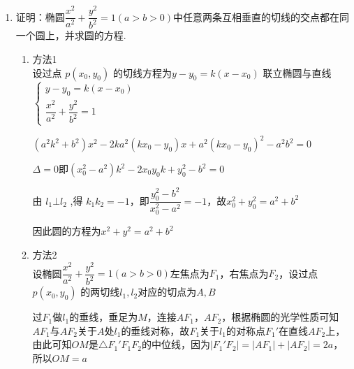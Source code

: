 \begin{enumerate}
\begin{jieda}
\begin{enumerate}
\begin{enumerate}
                因为$x_0 \in [-2, 2]$，所以$\sqrt{16-x_0^2} \in [2\sqrt{3}, 4]$，因此$S = 4d\sqrt{7-d^2} = 4\sqrt{7d^2-d^4} \in [8\sqrt{3}, 14]$.
            \end{enumerate}
        \end{enumerate}
    \end{jieda}
    
    \item 证明：椭圆$\dfrac{x^2}{a^2}+\dfrac{y^2}{b^2} = 1 (a>b>0)$中任意两条互相垂直的切线的交点都在同一个圆上，并求圆的方程.
    \begin{jieda}
        \begin{enumerate}
            \item 方法1 \\
            设过点 $p\left( {{x}_{0},{y}_{0}}\right)$ 的切线方程为$y - {y}_{0} = k\left( {x - {x}_{0}}\right)$ 联立椭圆与直线$\left\{  \begin{matrix} y - {y}_{0} = k\left( {x - {x}_{0}}\right) \\  \dfrac{{x}^{2}}{{a}^{2}} + \dfrac{{y}^{2}}{{b}^{2}} = 1 \end{matrix}\right.$
            
            $\left( {{a}^{2}{k}^{2} + {b}^{2}}\right) {x}^{2} - {2k}{a}^{2}\left( {k{x}_{0} - {y}_{0}}\right) x + {a}^{2}\left( k{x}_{0} - {y}_{0}\right)^{2} - {a}^{2}{b}^{2} = 0$
    
            $\Delta  = 0$即$\left( {{x}_{0}^{2} - {a}^{2}}\right) {k}^{2} - 2{x}_{0}{y}_{0}k + {y}_{0}^{2} - {b}^{2} = 0$
            
            由 ${l}_{1} \bot  {l}_{2}$ ,得 ${k}_{1}{k}_{2} =  - 1$，即$\dfrac{{y}_{0}^{2} - {b}^{2}}{{x}_{0}^{2} - {a}^{2}} =  - 1$，故${x}_{0}^{2} + {y}_{0}^{2} = {a}^{2} + {b}^{2}$
    
            因此圆的方程为$x^2+y^2 = a^2+b^2$
            \item 方法2 \\
            
            设椭圆$\dfrac{x^2}{a^2}+\dfrac{y^2}{b^2} = 1 (a>b>0)$左焦点为$F_1$，右焦点为$F_2$，设过点 $p\left( {{x}_{0},{y}_{0}}\right)$ 的两切线$l_1, l_2$对应的切点为$A, B$
            
            过$F_1$做$l_1$的垂线，垂足为$M$，连接$AF_1$，$AF_2$，根据椭圆的光学性质可知$AF_1$与$AF_2$关于$A$处$l_1$的垂线对称，故$F_1$关于$l_1$的对称点$F_1'$在直线$AF_2$上，由此可知$OM$是$\triangle F_1'F_1F_2$的中位线，因为$|F_1'F_2| = |AF_1| + |AF_2| = 2a$，所以$OM = a$
            

\end{enumerate}
\end{jieda}
\end{enumerate}
